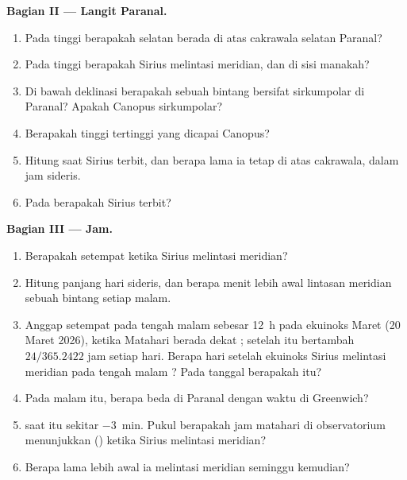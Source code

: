 \begin{problem}
\medskip
\noindent\textbf{Bagian II --- Langit Paranal.}
\begin{enumerate}[resume]
  \item Pada tinggi berapakah  selatan berada di atas cakrawala selatan Paranal?
  \item Pada tinggi berapakah Sirius melintasi meridian, dan di sisi  manakah?
  \item Di bawah deklinasi berapakah sebuah bintang bersifat sirkumpolar di Paranal? Apakah Canopus sirkumpolar?
  \item Berapakah tinggi tertinggi yang dicapai Canopus?
  \item Hitung  saat Sirius terbit, dan berapa lama ia tetap di atas cakrawala, dalam jam sideris.
  \item Pada  berapakah Sirius terbit?
\end{enumerate}

\medskip
\noindent\textbf{Bagian III --- Jam.}
\begin{enumerate}[resume]
  \item Berapakah  setempat ketika Sirius melintasi meridian?
  \item Hitung panjang hari sideris, dan berapa menit lebih awal lintasan meridian sebuah bintang setiap malam.
  \item Anggap  setempat pada tengah malam  sebesar \qty{12}{h} pada ekuinoks Maret (20 Maret 2026), ketika Matahari berada dekat ; setelah itu  bertambah $24/365.2422$ jam setiap hari. Berapa hari setelah ekuinoks Sirius melintasi meridian pada tengah malam ? Pada tanggal berapakah itu?
  \item Pada malam itu, berapa beda  di Paranal dengan waktu di Greenwich?
  \item {} saat itu sekitar \qty{-3}{min}. Pukul berapakah jam matahari di observatorium menunjukkan () ketika Sirius melintasi meridian?
  \item Berapa lama lebih awal ia melintasi meridian seminggu kemudian?
\end{enumerate}


\end{problem}
